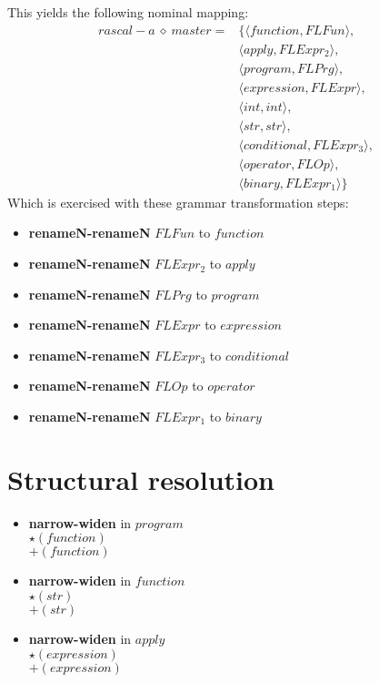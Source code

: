 This yields the following nominal mapping:
\begin{align*}\mathit{rascal-a} \:\diamond\: \mathit{master} =& \{\langle \mathit{function},\mathit{FLFun}\rangle,\\
 & \langle \mathit{apply},\mathit{FLExpr_2}\rangle,\\
 & \langle \mathit{program},\mathit{FLPrg}\rangle,\\
 & \langle \mathit{expression},\mathit{FLExpr}\rangle,\\
 & \langle int,int\rangle,\\
 & \langle str,str\rangle,\\
 & \langle \mathit{conditional},\mathit{FLExpr_3}\rangle,\\
 & \langle \mathit{operator},\mathit{FLOp}\rangle,\\
 & \langle \mathit{binary},\mathit{FLExpr_1}\rangle\}\end{align*}
 Which is exercised with these grammar transformation steps:

{\footnotesize\begin{itemize}
\item \textbf{renameN-renameN} $\mathit{FLFun}$ to $\mathit{function}$
\item \textbf{renameN-renameN} $\mathit{FLExpr_2}$ to $\mathit{apply}$
\item \textbf{renameN-renameN} $\mathit{FLPrg}$ to $\mathit{program}$
\item \textbf{renameN-renameN} $\mathit{FLExpr}$ to $\mathit{expression}$
\item \textbf{renameN-renameN} $\mathit{FLExpr_3}$ to $\mathit{conditional}$
\item \textbf{renameN-renameN} $\mathit{FLOp}$ to $\mathit{operator}$
\item \textbf{renameN-renameN} $\mathit{FLExpr_1}$ to $\mathit{binary}$
\end{itemize}}

\section{Structural resolution}
{\footnotesize\begin{itemize}
\item \textbf{narrow-widen}  in $\mathit{program}$\\$\star \left(\mathit{function}\right)$\\$\plus \left(\mathit{function}\right)$
\item \textbf{narrow-widen}  in $\mathit{function}$\\$\star \left(str\right)$\\$\plus \left(str\right)$
\item \textbf{narrow-widen}  in $\mathit{apply}$\\$\star \left(\mathit{expression}\right)$\\$\plus \left(\mathit{expression}\right)$
\end{itemize}}
